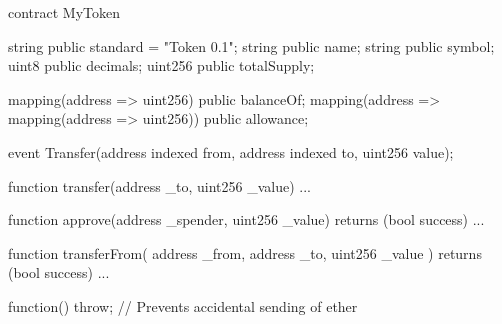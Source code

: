 contract MyToken {
    string public standard = "Token 0.1";
    string public name;
    string public symbol;
    uint8 public decimals;
    uint256 public totalSupply;

    mapping(address => uint256) public balanceOf;
    mapping(address => mapping(address => uint256)) public allowance;

    event Transfer(address indexed from, address indexed to, uint256 value);

    function transfer(address _to, uint256 _value) {
        ...
    }

    function approve(address _spender, uint256 _value) returns (bool success) {
        ...
    }

    function transferFrom(
        address _from,
        address _to,
        uint256 _value
    ) returns (bool success) {
        ...
    }

    function() {
        throw; // Prevents accidental sending of ether
    }
}
